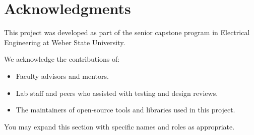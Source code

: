 \chapter{Acknowledgments}

This project was developed as part of the senior capstone program in Electrical Engineering at Weber State University.

We acknowledge the contributions of:
\begin{itemize}
  \item Faculty advisors and mentors.
  \item Lab staff and peers who assisted with testing and design reviews.
  \item The maintainers of open-source tools and libraries used in this project.
\end{itemize}

You may expand this section with specific names and roles as appropriate.
